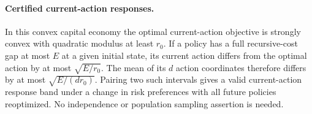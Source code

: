 \paragraph{Certified current-action responses.}
In this convex capital economy the optimal current-action objective is
strongly convex with quadratic modulus at least $r_0$.
If a policy has a full recursive-cost gap at most $E$ at a given initial state,
its current action differs from the optimal action by at most $\sqrt{E/r_0}$.
The mean of its $d$ action coordinates therefore differs by at most
$\sqrt{E/(dr_0)}$. Pairing two such intervals gives a valid current-action
response band under a change in risk preferences with all future policies
reoptimized. No independence or population sampling assertion is needed.
